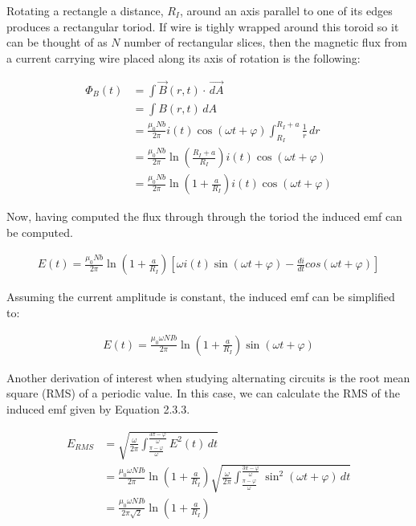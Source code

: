 \documentclass{article}
\numberwithin{equation}{subsection}
\begin{document}
Rotating a rectangle a distance, \(R_I\), around an axis parallel to one of its edges produces a rectangular toriod. If
wire is tighly wrapped around this toroid so it can be thought of as \(N\) number of rectangular slices,
then the magnetic flux from a current carrying wire placed along its axis of rotation is the following: 

\begin{equation}
\begin{split}
\Phi_B(t) & = \int \vec{B}(r, t) \cdot \, \vec{dA} \\
  & = \int B(r, t) \, dA \\
  & = \frac{\mu_0 N b}{2 \pi} i(t) \cos(\omega t + \varphi) \int_{R_I}^{R_I + a} \frac{1}{r} \, dr \\
  & = \frac{\mu_0 N b}{2 \pi} \ln(\frac{R_I + a}{R_I}) i(t) \cos(\omega t + \varphi) \\
  & = \frac{\mu_0 N b}{2 \pi} \ln(1 + \frac{a}{R_I}) i(t) \cos(\omega t + \varphi)
\end{split}
\end{equation}

Now, having computed the flux through through the toriod the induced emf can be computed.

\begin{equation}
\begin{split}
E(t) = \frac{\mu_0 N b}{2 \pi} \ln(1 + \frac{a}{R_I}) [ \omega i(t) \sin(\omega t + \varphi) - \frac{di}{dt} cos(\omega t + \varphi)]
\end{split}
\end{equation}

Assuming the current amplitude is constant, the induced emf can be simplified to:

\begin{equation}
\begin{split}
E(t) = \frac{\mu_0 \omega N I b}{2 \pi} \ln(1 + \frac{a}{R_I}) \sin(\omega t + \varphi)
\end{split}
\end{equation}

Another derivation of interest when studying alternating circuits is the root mean square (RMS) of a periodic value.
In this case, we can calculate the RMS of the induced emf given by Equation 2.3.3.

\begin{equation}
\begin{split}
E_{RMS} & = \sqrt{\frac{\omega}{2 \pi} \int_{\frac{\pi - \varphi}{\omega}}^{\frac{3 \pi - \varphi}{\omega}} E^2(t) \, dt} \\
  & = \frac{\mu_0 \omega N I b}{2 \pi} \ln(1 + \frac{a}{R_I}) \sqrt{\frac{\omega}{2 \pi} \int_{\frac{\pi - \varphi}{\omega}}^{\frac{3 \pi - \varphi}{\omega}} \sin^2(\omega t + \varphi) \, dt} \\
  & = \frac{\mu_0 \omega N I b}{2 \pi \sqrt{2}} \ln(1 + \frac{a}{R_I})
\end{split}
\end{equation}
\end{document}
